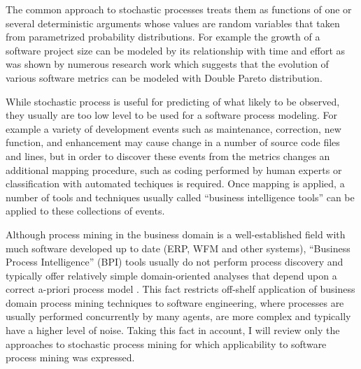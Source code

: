 The common approach to stochastic processes treats them as functions of one or several deterministic arguments whose 
values are random variables that taken from parametrized probability distributions. For example the growth of a software 
project size can be modeled by its relationship with time and effort as was shown by numerous research work 
\cite{citeulike:330266} \cite{citeulike:12849755} \cite{citeulike:12849753} \cite{citeulike:328047} \cite{citeulike:12849771}
which suggests that the evolution of various software metrics can be modeled with Double Pareto distribution.

While stochastic process is useful for predicting of what likely to be observed, they usually are too low level to be used for
a software process modeling. For example a variety of development events such as maintenance, correction, new function,
and enhancement may cause change in a number of source code files and lines, but in order to discover these events 
from the metrics changes an additional mapping procedure, such as coding performed by human experts or classification 
with automated techiques is required. Once mapping is applied, a number of tools and techniques usually called ``business 
intelligence tools'' can be applied to these collections of events.

Although process mining in the business domain is a well-established field with much software developed up to date 
(ERP, WFM and other systems), ``Business Process Intelligence'' (BPI) tools usually do not perform process discovery and 
typically offer relatively simple domain-oriented analyses that depend upon a correct a-priori process model 
\cite{citeulike:3718014} \cite{citeulike:5044991}. 
This fact restricts off-shelf application of business domain process mining techniques to software engineering, where 
processes are usually performed concurrently by many agents, are more complex and typically have a higher level of noise. 
Taking this fact in account, I will review only the approaches to stochastic process mining for which applicability to software 
process mining was expressed. 

